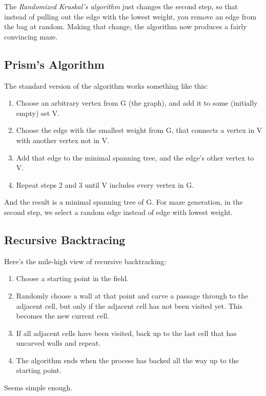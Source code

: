 \documentclass{article}
\begin{document}
The {\it Randomized Kruskal's algorithm} just changes the second step, so that instead of pulling out the edge with the lowest weight, you remove an edge from the bag at random. Making that change, the algorithm now produces a fairly convincing maze.

\subsection{Prism's Algorithm}
The standard version of the algorithm works something like this:
\begin{enumerate}
    \item Choose an arbitrary vertex from G (the graph), and add it to some (initially empty) set V.
    \item Choose the edge with the smallest weight from G, that connects a vertex in V with another vertex not in V.
    \item Add that edge to the minimal spanning tree, and the edge's other vertex to V.
    \item Repeat steps 2 and 3 until V includes every vertex in G.
\end{enumerate}

And the result is a minimal spanning tree of G. For maze generation, in the second step, we select a random edge instead of edge with lowest weight.

\subsection{Recursive Backtracing}
Here's the mile-high view of recursive backtracking:
\begin{enumerate}
    \item Choose a starting point in the field.
    \item Randomly choose a wall at that point and carve a passage through to the adjacent cell, but only if the adjacent cell has not been visited yet. This becomes the new current cell.
    \item If all adjacent cells have been visited, back up to the last cell that has uncarved walls and repeat.
    \item The algorithm ends when the process has backed all the way up to the starting point.
\end{enumerate}

Seems simple enough.
\end{document}
